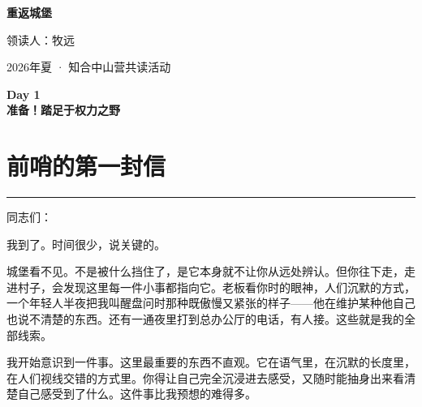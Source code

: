 \documentclass[12pt,a4paper]{article}
\begin{document}
\thispagestyle{empty}

\vspace*{6cm}

\begin{center}
{\Huge\bfseries 重返城堡}

\vspace{2.5cm}

{\large 领读人：牧远}

\vspace{1em}

{\large 2026年夏 · 知合中山营共读活动}

\end{center}
\newpage
\renewcommand{\contentsname}{目录}
\tableofcontents
\newpage
\begin{center}
{\LARGE \bfseries Day 1\\[1em]准备！踏足于权力之野}
\end{center}
\vspace{3em}
\section{前哨的第一封信}
\vspace{0.5em}
\vspace{0.3em}

\noindent\rule{\textwidth}{0.4pt}

\vspace{0.3em}



同志们：



我到了。时间很少，说关键的。



城堡看不见。不是被什么挡住了，是它本身就不让你从远处辨认。但你往下走，走进村子，会发现这里每一件小事都指向它。老板看你时的眼神，人们沉默的方式，一个年轻人半夜把我叫醒盘问时那种既傲慢又紧张的样子——他在维护某种他自己也说不清楚的东西。还有一通夜里打到总办公厅的电话，有人接。这些就是我的全部线索。



我开始意识到一件事。这里最重要的东西不直观。它在语气里，在沉默的长度里，在人们视线交错的方式里。你得让自己完全沉浸进去感受，又随时能抽身出来看清楚自己感受到了什么。这件事比我预想的难得多。
\end{document}
